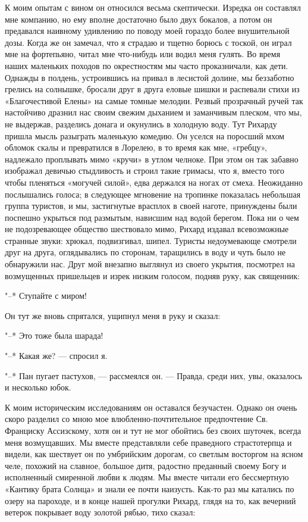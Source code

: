 К  моим опытам  с вином  он относился  весьма скептически.  Изредка он
составлял мне компанию, но ему  вполне достаточно было двух бокалов, а
потом он  предавался наивному удивлению  по поводу моей  гораздо более
внушительной дозы. Когда же он замечал,  что я страдаю и тщетно борюсь
с тоской, он  играл мне на фортепьяно, читал мне  что-нибудь или водил
меня гулять. Во время наших маленьких походов по окрестностям мы часто
проказничали, как  дети. Однажды  в полдень,  устроившись на  привал в
лесистой долине,  мы беззаботно  грелись на  солнышке, бросали  друг в
друга еловые шишки и распевали стихи из «Благочестивой Елены» на самые
томные  мелодии. Резвый  прозрачный ручей  так настойчиво  дразнил нас
своим  свежим дыханием  и  заманчивым плеском,  что  мы, не  выдержав,
разделись донага и окунулись в холодную воду. Тут Рихарду пришла мысль
разыграть маленькую комедию. Он уселся  на поросший мхом обломок скалы
и  превратился в  Лорелею, в  то  время как  мне, «гребцу»,  надлежало
проплывать  мимо «кручи»  в утлом  челноке.  При этом  он так  забавно
изображал девичью  стыдливость и строил  такие гримасы, что  я, вместо
того чтобы пленяться «могучей силой», едва держался на ногах от смеха.
Неожиданно  послышались  голоса;  в следующее  мгновение  на  тропинке
показалась  небольшая группа  туристов, и  мы, застигнутые  врасплох в
своей наготе, принуждены были поспешно укрыться под размытым, нависшим
над водой берегом. Пока ни  о чем не подозревающее общество шествовало
мимо, Рихард издавал всевозможные странные звуки: хрюкал, подвизгивал,
шипел. Туристы  недоумевающе смотрели  друг на друга,  оглядывались по
сторонам,  таращились в  воду  и  чуть было  не  обнаружили нас.  Друг
мой  внезапно выглянул  из  своего укрытия,  посмотрел на  возмущенных
пришельцев и изрек низким голосом, подняв руку, как священник:

"--* Ступайте с миром!

Он тут же вновь спрятался, ущипнул меня в руку и сказал:

"--* Это тоже была шарада!

"--* Какая же? --- спросил я.

"--* Пан  пугает пастухов, ---  рассмеялся он. --- Правда,  среди них,
увы, оказалось и несколько юбок.

К моим  историческим исследованиям он оставался  безучастен. Однако он
очень скоро  разделил со мною мое  влюбленно-почтительное предпочтение
Св.  Франциску  Ассизскому,  хотя  он   и  тут  не  мог  обойтись  без
своих шуточек,  всегда меня  возмущавших. Мы вместе  представляли себе
праведного  страстотерпца  и видели,  как  шествует  он по  умбрийским
дорогам,  со светлым  восторгом  на ясном  челе,  похожий на  славное,
большое дитя,  радостно преданный своему Богу  и исполненный смиренной
любви к людям. Мы вместе читали его бессмертную «Кантику брата Солнца»
и  знали  ее почти  наизусть.  Как-то  раз  мы  катались по  озеру  на
пароходе, и в  конце нашей прогулки Рихард, глядя на  то, как вечерний
ветерок покрывает воду золотой рябью, тихо сказал:

